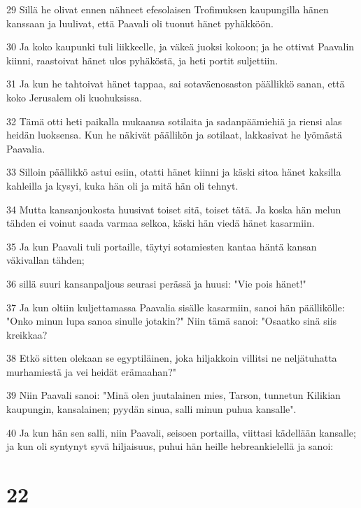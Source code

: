 \par 29 Sillä he olivat ennen nähneet efesolaisen Trofimuksen kaupungilla hänen kanssaan ja luulivat, että Paavali oli tuonut hänet pyhäkköön.
\par 30 Ja koko kaupunki tuli liikkeelle, ja väkeä juoksi kokoon; ja he ottivat Paavalin kiinni, raastoivat hänet ulos pyhäköstä, ja heti portit suljettiin.
\par 31 Ja kun he tahtoivat hänet tappaa, sai sotaväenosaston päällikkö sanan, että koko Jerusalem oli kuohuksissa.
\par 32 Tämä otti heti paikalla mukaansa sotilaita ja sadanpäämiehiä ja riensi alas heidän luoksensa. Kun he näkivät päällikön ja sotilaat, lakkasivat he lyömästä Paavalia.
\par 33 Silloin päällikkö astui esiin, otatti hänet kiinni ja käski sitoa hänet kaksilla kahleilla ja kysyi, kuka hän oli ja mitä hän oli tehnyt.
\par 34 Mutta kansanjoukosta huusivat toiset sitä, toiset tätä. Ja koska hän melun tähden ei voinut saada varmaa selkoa, käski hän viedä hänet kasarmiin.
\par 35 Ja kun Paavali tuli portaille, täytyi sotamiesten kantaa häntä kansan väkivallan tähden;
\par 36 sillä suuri kansanpaljous seurasi perässä ja huusi: "Vie pois hänet!"
\par 37 Ja kun oltiin kuljettamassa Paavalia sisälle kasarmiin, sanoi hän päällikölle: "Onko minun lupa sanoa sinulle jotakin?" Niin tämä sanoi: "Osaatko sinä siis kreikkaa?
\par 38 Etkö sitten olekaan se egyptiläinen, joka hiljakkoin villitsi ne neljätuhatta murhamiestä ja vei heidät erämaahan?"
\par 39 Niin Paavali sanoi: "Minä olen juutalainen mies, Tarson, tunnetun Kilikian kaupungin, kansalainen; pyydän sinua, salli minun puhua kansalle".
\par 40 Ja kun hän sen salli, niin Paavali, seisoen portailla, viittasi kädellään kansalle; ja kun oli syntynyt syvä hiljaisuus, puhui hän heille hebreankielellä ja sanoi:

\chapter{22}

